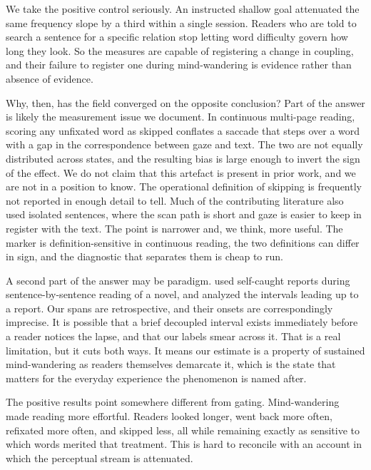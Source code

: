 \documentclass[11pt]{article}
\begin{document}
We take the positive control seriously. An instructed shallow goal attenuated the same
frequency slope by a third within a single session. Readers who are told to search a sentence
for a specific relation stop letting word difficulty govern how long they look. So the
measures are capable of registering a change in coupling, and their failure to register one
during mind-wandering is evidence rather than absence of evidence.

Why, then, has the field converged on the opposite conclusion? Part of the answer is likely
the measurement issue we document. In continuous multi-page reading, scoring any unfixated
word as skipped conflates a saccade that steps over a word with a gap in the correspondence
between gaze and text. The two are not equally distributed across states, and the resulting
bias is large enough to invert the sign of the effect. We do not claim that this artefact is present in prior work, and we are not in a position to know.
The operational definition of skipping is frequently not reported in enough detail to tell. Much
of the contributing literature also used isolated sentences, where the scan path is short and gaze
is easier to keep in register with the text. The point is narrower
and, we think, more useful. The marker is definition-sensitive in continuous reading, the two
definitions can differ in sign, and the diagnostic that separates them is cheap to run.

A second part of the answer may be paradigm. \citet{reichle2010} used self-caught reports
during sentence-by-sentence reading of a novel, and analyzed the intervals leading up to a
report. Our spans are retrospective, and their onsets are correspondingly imprecise. It is
possible that a brief decoupled interval exists immediately before a reader notices the lapse,
and that our labels smear across it. That is a real limitation, but it cuts both ways. It
means our estimate is a property of sustained mind-wandering as readers themselves demarcate
it, which is the state that matters for the everyday experience the phenomenon is named after.

The positive results point somewhere different from gating. Mind-wandering made reading more
effortful. Readers looked longer, went back more often, refixated more often, and skipped less,
all while remaining exactly as sensitive to which words merited that treatment. This is hard to
reconcile with an account in which the perceptual stream is attenuated.
\end{document}
